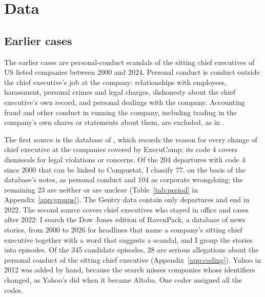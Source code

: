 \documentclass[11pt,a4paper]{article}
\begin{document}
\section{Data}\label{sec:data}

\subsection{Earlier cases}

The earlier cases are personal-conduct scandals of the sitting chief executives of US listed companies between 2000 and 2024. Personal conduct is conduct outside the chief executive's job at the company: relationships with employees, harassment, personal crimes and legal charges, dishonesty about the chief executive's own record, and personal dealings with the company. Accounting fraud and other conduct in running the company, including trading in the company's own shares or statements about them, are excluded, as in \citet{cline2018}.

The first source is the database of \citet{gentry2021}, which records the reason for every change of chief executive at the companies covered by ExecuComp; its code 4 covers dismissals for legal violations or concerns. Of the 204 departures with code 4 since 2000 that can be linked to Compustat, I classify 77, on the basis of the database's notes, as personal conduct and 104 as corporate wrongdoing; the remaining 23 are neither or are unclear (Table~\ref{tab:period} in Appendix~\ref{app:groups}). The Gentry data contain only departures and end in 2022. The second source covers chief executives who stayed in office and cases after 2022: I search the Dow Jones edition of RavenPack, a database of news stories, from 2000 to 2026 for headlines that name a company's sitting chief executive together with a word that suggests a scandal, and I group the stories into episodes. Of the 345 candidate episodes, 28 are serious allegations about the personal conduct of the sitting chief executive (Appendix~\ref{app:coding}). Yahoo in 2012 was added by hand, because the search misses companies whose identifiers changed, as Yahoo's did when it became Altaba. One coder assigned all the codes.
\end{document}
